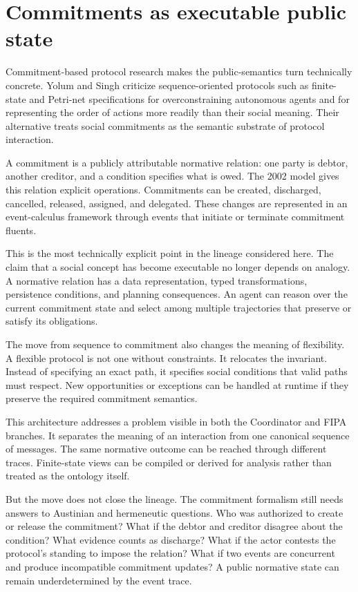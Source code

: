 \documentclass[11pt]{article}
\begin{document}
\section{Commitments as executable public state}
Commitment-based protocol research makes the public-semantics turn technically concrete. Yolum and Singh criticize sequence-oriented protocols such as finite-state and Petri-net specifications for overconstraining autonomous agents and for representing the order of actions more readily than their social meaning. Their alternative treats social commitments as the semantic substrate of protocol interaction. \cite{yolumsingh2002flexible}

A commitment is a publicly attributable normative relation: one party is debtor, another creditor, and a condition specifies what is owed. The 2002 model gives this relation explicit operations. Commitments can be created, discharged, cancelled, released, assigned, and delegated. These changes are represented in an event-calculus framework through events that initiate or terminate commitment fluents. \cite{yolumsingh2002flexible}

This is the most technically explicit point in the lineage considered here. The claim that a social concept has become executable no longer depends on analogy. A normative relation has a data representation, typed transformations, persistence conditions, and planning consequences. An agent can reason over the current commitment state and select among multiple trajectories that preserve or satisfy its obligations.

The move from sequence to commitment also changes the meaning of flexibility. A flexible protocol is not one without constraints. It relocates the invariant. Instead of specifying an exact path, it specifies social conditions that valid paths must respect. New opportunities or exceptions can be handled at runtime if they preserve the required commitment semantics. \cite{yolumsingh2002flexible}

This architecture addresses a problem visible in both the Coordinator and FIPA branches. It separates the meaning of an interaction from one canonical sequence of messages. The same normative outcome can be reached through different traces. Finite-state views can be compiled or derived for analysis rather than treated as the ontology itself.

But the move does not close the lineage. The commitment formalism still needs answers to Austinian and hermeneutic questions. Who was authorized to create or release the commitment? What if the debtor and creditor disagree about the condition? What evidence counts as discharge? What if the actor contests the protocol's standing to impose the relation? What if two events are concurrent and produce incompatible commitment updates? A public normative state can remain underdetermined by the event trace.
\end{document}
